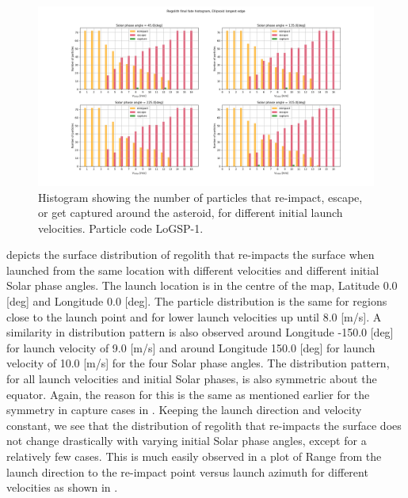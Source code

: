\begin{figure}[htb]
\centering
\captionsetup{justification=centering}
\includegraphics[angle=90, width=\textwidth, height=\textheight]{longest_edge_perturbations/3.2Density_1cmSize/final_fate_versus_launch_velocity_histogram_all_solar_phases.png}
\caption{Histogram showing the number of particles that re-impact, escape, or get captured around the asteroid, for different initial launch velocities. Particle code LoGSP-1.}
\label{fig:LoGSP_1_final_fate_histogram}
\end{figure}
\FloatBarrier
 depicts the surface distribution of regolith that re-impacts the surface when launched from the same location with different velocities and different initial Solar phase angles. The launch location is in the centre of the map, Latitude 0.0 [deg] and Longitude 0.0 [deg]. The particle distribution is the same for regions close to the launch point and for lower launch velocities up until 8.0 [m/s]. A similarity in distribution pattern is also observed around Longitude -150.0 [deg] for launch velocity of 9.0 [m/s] and around Longitude 150.0 [deg] for launch velocity of 10.0 [m/s] for the four Solar phase angles. The distribution pattern, for all launch velocities and initial Solar phases, is also symmetric about the equator. Again, the reason for this is the same as mentioned earlier for the symmetry in capture cases in . Keeping the launch direction and velocity constant, we see that the distribution of regolith that re-impacts the surface does not change drastically with varying initial Solar phase angles, except for a relatively few cases. This is much easily observed in a plot of Range from the launch direction to the re-impact point versus launch azimuth for different velocities as shown in .

